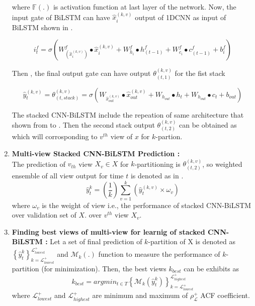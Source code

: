 \documentclass[a4paper, fleqn]{cas-sc}
\theoremstyle{definition}
\theoremstyle{remark}
\begin{document}
\begin{enumerate}[label=(\alph*)]
where $\mathbb{F}(.)$ is activation function at last layer of the network. Now,  the input gate of BiLSTM can have $\hat{x}_i^{(k, v)}$ output of 1DCNN as input of BiLSTM shown in .

\begin{equation}
\label{si}
  i_t^f = \sigma \left(W_{\left(\hat{x}_i^{(k, v)} \right)}^f  \bullet \hat{x}_i^{(k, v)} +W_{h_i}^f \bullet h_{(t-1)}^f +W_{c_i}^f \bullet c_{(t-1)}^f +b_i^f \right)
\end{equation}

Then ,  the final output gate can have output $\theta _{(t, 1)}^{(k, v)}$ for the fist stack

\begin{equation} \label{thi fin}
  \hat{y}_t^{(k, v)}=\theta _{(t, stack)}^{(k, v)}= \sigma \left(W_{\hat{x}_{out}^{(k, v)}} \bullet \hat{x}_{out}^{(k, v)} +  W_{h_{out}} \bullet h_t +W_{h_{out}} \bullet c_t +b_{out} \right)
\end{equation}

The stacked CNN-BiLSTM include the repeation of same architecture that shown from  to . Then the second stack output $\theta _{(t, 2)}^{(k, v)}$ can be obtained as  which will corrosponding  to $v^{th}$ view of $x$ for $k$-partion. 



  \item \textbf{Multi-view Stacked CNN-BiLSTM Prediction : }\\
  The prediction of $v_{th}$ view $X_v \in X$ for $k$-partitioning is $\theta_{(t, 2)}^{(k, v)} $, so weighted ensemble of all view output for time $t$ is denoted as in  .
  \begin{equation} \label{sta cb}
    \hat{y}_t^k= \left(\frac{1}{k} \right) \sum_{v=1}^{k} \left(\hat{y}_t^{(k, v)} \times \omega_v \right)
  \end{equation}
  where $\omega_v$ is the weight of view i.e.,  the performance of stacked CNN-BiLSTM over validation set of $X$. over $v^{th}$ view $X_v$.



  \item \textbf{Finding best views of multi-view for learnig of stacked CNN-BiLSTM : }
  Let a set of final prediction of $k$-partition of X is denoted as  $\left\{\hat{y}_t^k \right\}_{k=\mathscr{L}_{lowest}^+}^{\mathscr{L}_{lowest}^+}$ and $\mathcal{M}_k(.)$ function to measure the performance of $k$-partition (for minimization). Then,  the best views $k_{best}$ can be exhibits as 
  \begin{equation} \label{bv}
    k_{best}=arg min_{t \in T} \left\{\mathcal{M}_k \left(\hat{y}_t^k \right) \right\}_{k=\mathscr{L}_{lowest}^+}^{\mathscr{L}_{highest}^+}
  \end{equation}
  where $\mathscr{L}_{lowest}^+$ and $\mathscr{L}_{highest}^+$ are minimum and maximum of $\rho_{\mathscr{L}}^+$ ACF coefficient.
  \end{enumerate}
\end{document}
